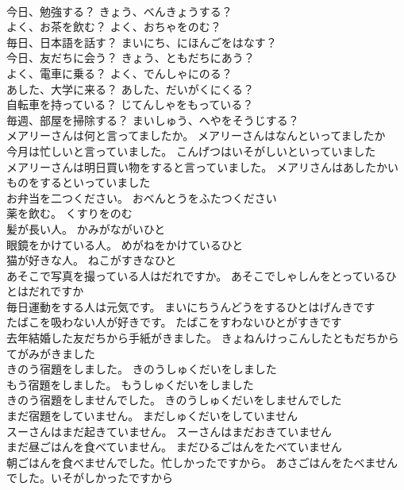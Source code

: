 \documentclass[8pt]{extreport}
\begin{document}
\begin{CJK}{UTF8}{min}
\\	今日、勉強する？	きょう、べんきょうする？ 
\\	よく、お茶を飲む？	よく、おちゃをのむ？ 
\\	毎日、日本語を話す？	まいにち、にほんごをはなす？ 
\\	今日、友だちに会う？	きょう、ともだちにあう？ 
\\	よく、電車に乗る？	よく、でんしゃにのる？ 
\\	あした、大学に来る？	あした、だいがくにくる？ 
\\	自転車を持っている？	じてんしゃをもっている？ 
\\	毎週、部屋を掃除する？	まいしゅう、へやをそうじする？ 
\\	メアリーさんは何と言ってましたか。	メアリーさんはなんといってましたか 
\\	今月は忙しいと言っていました。	こんげつはいそがしいといっていました 
\\	メアリーさんは明日買い物をすると言っていました。	メアリさんはあしたかいものをするといっていました 
\\	お弁当を二つください。	おべんとうをふたつください 
\\	薬を飲む。	くすりをのむ 
\\	髪が長い人。	かみがながいひと 
\\	眼鏡をかけている人。	めがねをかけているひと 
\\	猫が好きな人。	ねこがすきなひと 
\\	あそこで写真を撮っている人はだれですか。	あそこでしゃしんをとっているひとはだれですか 
\\	毎日運動をする人は元気です。	まいにちうんどうをするひとはげんきです 
\\	たばこを吸わない人が好きです。	たばこをすわないひとがすきです 
\\	去年結婚した友だちから手紙がきました。	きょねんけっこんしたともだちからてがみがきました 
\\	きのう宿題をしました。	きのうしゅくだいをしました 
\\	もう宿題をしました。	もうしゅくだいをしました 
\\	きのう宿題をしませんでした。	きのうしゅくだいをしませんでした 
\\	まだ宿題をしていません。	まだしゅくだいをしていません 
\\	スーさんはまだ起きていません。	スーさんはまだおきていません 
\\	まだ昼ごはんを食べていません。	まだひるごはんをたべていません 
\\	朝ごはんを食べませんでした。忙しかったですから。	あさごはんをたべませんでした。いそがしかったですから 

\end{CJK}
\end{document}
